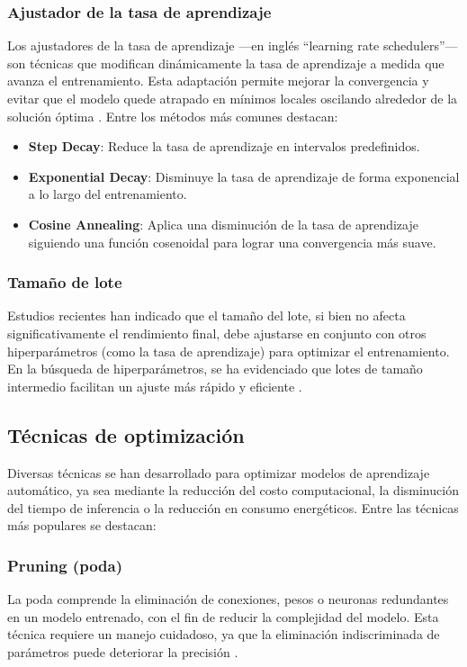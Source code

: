 \subsubsection{Ajustador de la tasa de aprendizaje}
Los ajustadores de la tasa de aprendizaje ---en inglés ``learning rate schedulers''--- son técnicas que modifican dinámicamente la tasa de aprendizaje a medida que avanza el entrenamiento. Esta adaptación permite mejorar la convergencia y evitar que el modelo quede atrapado en mínimos locales oscilando alrededor de la solución óptima \cite{Bengio2012}. Entre los métodos más comunes destacan:

\begin{itemize}
\setlength\itemsep{-0.3em}
    \item \textbf{Step Decay}: Reduce la tasa de aprendizaje en intervalos predefinidos.
    \item \textbf{Exponential Decay}: Disminuye la tasa de aprendizaje de forma exponencial a lo largo del entrenamiento.
    \item \textbf{Cosine Annealing}: Aplica una disminución de la tasa de aprendizaje siguiendo una función cosenoidal para lograr una convergencia más suave.
\end{itemize}

\subsubsection{Tamaño de lote}
Estudios recientes han indicado que el tamaño del lote, si bien no afecta significativamente el rendimiento final, debe ajustarse en conjunto con otros hiperparámetros (como la tasa de aprendizaje) para optimizar el entrenamiento. En la búsqueda de hiperparámetros, se ha evidenciado que lotes de tamaño intermedio facilitan un ajuste más rápido y eficiente \cite{Shallue2018, Breuel2015}.

\subsection{Técnicas de optimización}
Diversas técnicas se han desarrollado para optimizar modelos de aprendizaje automático, ya sea mediante la reducción del costo computacional, la disminución del tiempo de inferencia o la reducción en consumo energéticos. Entre las técnicas más populares se destacan:

\subsubsection{Pruning (poda)}
La poda comprende la eliminación de conexiones, pesos o neuronas redundantes en un modelo entrenado, con el fin de reducir la complejidad del modelo. Esta técnica requiere un manejo cuidadoso, ya que la eliminación indiscriminada de parámetros puede deteriorar la precisión \cite{Cheng2018}.

